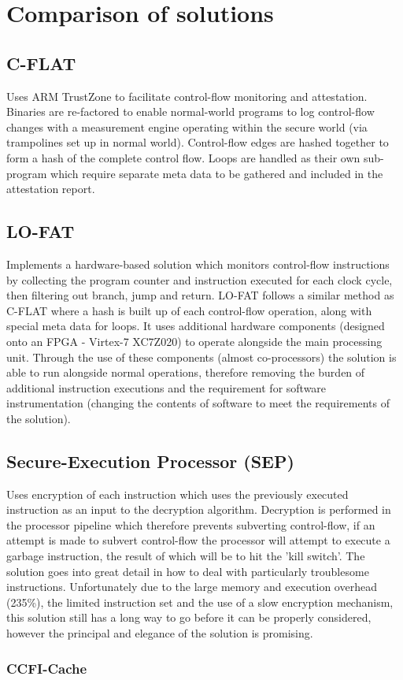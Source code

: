 \section{Comparison of solutions}

\subsection{C-FLAT}
Uses ARM TrustZone to facilitate control-flow monitoring and attestation. Binaries are re-factored to enable normal-world programs to log control-flow changes with a measurement engine operating within the secure world (via trampolines set up in normal world). Control-flow edges are hashed together to form a hash of the complete control flow. Loops are handled as their own sub-program which require separate meta data to be gathered and included in the attestation report.

\subsection{LO-FAT}
Implements a hardware-based solution which monitors control-flow instructions by collecting the program counter and instruction executed for each clock cycle, then filtering out branch, jump and return. LO-FAT follows a similar method as C-FLAT where a hash is built up of each control-flow operation, along with special meta data for loops. It uses additional hardware components (designed onto an FPGA - Virtex-7 XC7Z020) to operate alongside the main processing unit. Through the use of these components (almost co-processors) the solution is able to run alongside normal operations, therefore removing the burden of additional instruction executions and the requirement for software instrumentation (changing the contents of software to meet the requirements of the solution).

\subsection{Secure-Execution Processor (SEP)}
Uses encryption of each instruction which uses the previously executed instruction as an input to the decryption algorithm. Decryption is performed in the processor pipeline which therefore prevents subverting control-flow, if an attempt is made to subvert control-flow the processor will attempt to execute a garbage instruction, the result of which will be to hit the 'kill switch'. The solution goes into great detail in how to deal with particularly troublesome instructions. Unfortunately due to the large memory and execution overhead (235\%), the limited instruction set and the use of a slow encryption mechanism, this solution still has a long way to go before it can be properly considered, however the principal and elegance of the solution is promising.

\subsubsection{CCFI-Cache}
